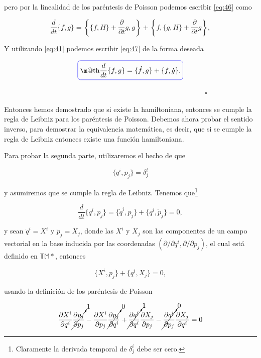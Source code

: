 \documentclass[a4paper,10pt]{article}
\makeatletter
\numberwithin{equation}{section}
\newcommand*{\boxcolor}{blue}
\renewcommand{\boxed}[1]{\textcolor{\boxcolor}{%
\tikz[baseline={([yshift=-1ex]current bounding box.center)}] \node [rectangle, minimum width=1ex,rounded corners,draw] {\normalcolor\m@th$\displaystyle#1$};}}
\makeatother
\begin{document}
pero por la linealidad de los paréntesis de Poisson podemos escribir \eqref{eq:46} como

\begin{equation}
  \frac{d}{dt}\{f,g\} = \left\{\{f,H\} + \frac{\partial}{\partial t}g, g\right\} + 
  \left\{f,\{g,H\} + \frac{\partial}{\partial t}g\right\},
  \label{eq:47}
\end{equation}

Y utilizando \eqref{eq:41} podemos escribir \eqref{eq:47} de la forma deseada

\begin{equation}
 \boxed{\frac{d}{dt}\{f,g\} = \{\dot{f},g\} + \{f,\dot{g}\}.}
\end{equation}

$\hspace{12cm} \square$

Entonces hemos demostrado que si existe la hamiltoniana, entonces se cumple la regla 
de Leibniz para los paréntesis de Poisson. Debemos ahora probar el sentido inverso, 
para demostrar la equivalencia matemática, es decir, que si se cumple la regla de 
Leibniz entonces existe una función hamiltoniana.

\vspace{.3cm}

Para probar la segunda parte, utilizaremos el hecho de que \cite{iro}

\begin{equation}
 \{q^i, p_j\} = \delta^i_j 
\end{equation}

y asumiremos que se cumple la regla de Leibniz. Tenemos que\footnote{Claramente la 
derivada temporal de $\delta^i_j$ debe ser cero.} 

\begin{equation}
 \frac{d}{dt} \{q^i, p_j\} = \{\dot{q}^i, p_j\} + \{q^i, \dot{p}_j\} = 0,
\end{equation}

y sean $\dot{q}^i = X^i$ y $\dot{p}_j = X_j$, donde las $X^i$ y 
$X_j$ son las componentes de un campo vectorial en la base inducida por las 
coordenadas $(\partial/\partial q^i,\partial/\partial p_j)$, el cual 
está definido en $\mathbb{TM*}$, entonces 

\begin{equation}
  \{X^i, p_j\} + \{q^i, X_j\} = 0,
\end{equation}

usando la definición de los paréntesis de Poisson

\begin{equation}
 \frac{\partial X^i}{\partial q^i}\cancelto{1}{\frac{\partial p_j}{\partial p_j}} - 
 \frac{\partial X^i}{\partial p_j}\cancelto{0}{\frac{\partial p_j}{\partial q^i}} + 
 \cancelto{1}{\frac{\partial q^i}{\partial q^i}}\frac{\partial X_j}{\partial p_j} - 
 \cancelto{0}{\frac{\partial q^i}{\partial p_j}}\frac{\partial X_j}{\partial q^i} = 0
\end{equation}
\end{document}
